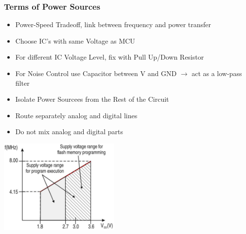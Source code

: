 \subsubsection{Terms of Power Sources }
\begin{minipage}{13cm}
	\begin{itemize}
		\item Power-Speed Tradeoff, link between frequency and power transfer
		\item Choose IC's with same Voltage as MCU
		\item For different IC Voltage Level, fix with Pull Up/Down Resistor
		\item For Noise Control use Capacitor between V and GND
        \subitem  $ \rightarrow $ act as a low-pass filter
		\item Isolate Power Sourcees from the Rest of the Circuit
		\item Route separately analog and digital lines 
		\item Do not mix analog and digital parts
	\end{itemize}
\end{minipage}
\begin{minipage}{5cm}
    \includegraphics[width=6cm]{images/PSTradeoff.png}
\end{minipage}

